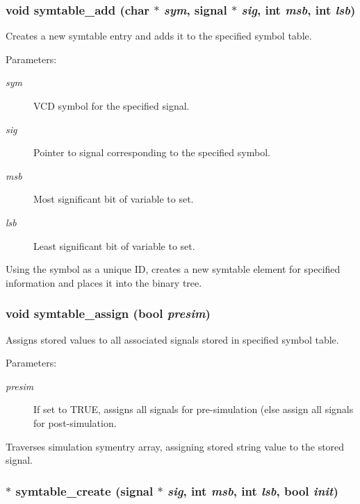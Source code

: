 \subsubsection{\setlength{\rightskip}{0pt plus 5cm}void symtable\_\-add (char $\ast$ {\em sym}, {\bf signal} $\ast$ {\em sig}, int {\em msb}, int {\em lsb})}\label{symtable_8c_a7}


Creates a new symtable entry and adds it to the specified symbol table. 

\begin{Desc}
\item[Parameters:]
\begin{description}
\item[{\em sym}]VCD symbol for the specified signal. \item[{\em sig}]Pointer to signal corresponding to the specified symbol. \item[{\em msb}]Most significant bit of variable to set. \item[{\em lsb}]Least significant bit of variable to set.\end{description}
\end{Desc}
Using the symbol as a unique ID, creates a new symtable element for specified information and places it into the binary tree. 
\subsubsection{\setlength{\rightskip}{0pt plus 5cm}void symtable\_\-assign ({\bf bool} {\em presim})}\label{symtable_8c_a9}


Assigns stored values to all associated signals stored in specified symbol table. 

\begin{Desc}
\item[Parameters:]
\begin{description}
\item[{\em presim}]If set to TRUE, assigns all signals for pre-simulation (else assign all signals for post-simulation.\end{description}
\end{Desc}
Traverses simulation symentry array, assigning stored string value to the stored signal. 
\subsubsection{$\ast$ symtable\_\-create ({\bf signal} $\ast$ {\em sig}, int {\em msb}, int {\em lsb}, {\bf bool} {\em init})}\label{symtable_8c_a6}


